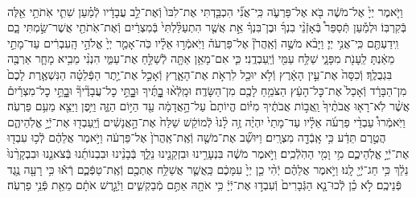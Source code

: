 \documentclass[twoside, openany, parskip=half, 11pt]{book}
\begin{document}
\begin{footnotesize}
\begin{multicols}{2}
\\
וַיֹּ֤אמֶר יְיָ֙ אֶל־מֹשֶׁ֔ה בֹּ֖א אֶל־פַּרְעֹ֑ה כִּֽי־אֲנִ֞י הִכְבַּ֤דְתִּי אֶת־לִבּוֹ֙ וְֿאֶת־לֵ֣ב עֲבָדָ֔יו לְֿמַ֗עַן שִׁתִ֛י אֹֽתֹתַ֥י אֵ֖לֶּה בְּֿקִרְבּֽוֹ׃ וּלְמַ֡עַן תְּֿסַפֵּר֩ בְּֿאָזְֿנֵ֨י בִנְךָ֜ וּבֶן־בִּנְךָ֗ אֵ֣ת אֲשֶׁ֤ר הִתְעַלַּ֨לְתִּי֙ בְּֿמִצְרַ֔יִם וְֿאֶת־אֹֽתֹתַ֖י אֲשֶׁר־שַׂ֣מְתִּי בָ֑ם וִֽידַעְתֶּ֖ם כִּֽי־אֲנִ֥י יְיָ׃ וַיָּבֹ֨א מֹשֶׁ֣ה וְֿאַֽהֲרֹן֘ אֶל־פַּרְעֹה֒ וַיֹּֽאמְֿר֣וּ אֵלָ֗יו כֹּֽה־אָמַ֤ר יְיָ֙ אֱלֹהֵ֣י הָֽעִבְרִ֔ים עַד־מָתַ֣י מֵאַ֔נְתָּ לֵֽעָנֹ֖ת מִפָּנָ֑י שַׁלַּ֥ח עַמִּ֖י וְֿיַֽעַבְדֻֽנִי׃  כִּ֛י אִם־מָאֵ֥ן אַתָּ֖ה לְֿשַׁלֵּ֣חַ אֶת־עַמִּ֑י הִנְנִ֨י מֵבִ֥יא מָחָ֛ר אַרְבֶּ֖ה בִּגְבֻלֶֽךָ׃ וְֿכִסָּה֙ אֶת־עֵ֣ין הָאָ֔רֶץ וְֿלֹ֥א יוּכַ֖ל לִרְאֹ֣ת אֶת־הָאָ֑רֶץ וְֿאָכַ֣ל אֶת־יֶ֣תֶר הַפְּֿלֵטָ֗ה הַנִּשְׁאֶ֤רֶת לָכֶם֙ מִן־הַבָּרָ֔ד וְֿאָכַל֙ אֶת־כׇּל־הָעֵ֔ץ הַצֹּמֵ֥חַ לָכֶ֖ם מִן־הַשָּׂדֶֽה׃ וּמָֽלְֿא֨וּ בׇׇׇׇׇָתֶּ֜יךָ וּבׇׇׇָתֵּ֣י כׇל־עֲבָדֶ֘יךָ֘ וּבׇׇׇָתֵּ֣י כׇל־מִצְרַ֒יִם֒ אֲשֶׁ֨ר לֹֽא־רָא֤וּ אֲבֹתֶ֨יךָ֙ וַֽאֲב֣וֹת אֲבֹתֶ֔יךָ מִיּ֗וֹם הֱיוֹתָם֙ עַל־הָ֣אֲדָמָ֔ה עַ֖ד הַיּ֣וֹם הַזֶּ֑ה וַיִּ֥פֶן וַיֵּצֵ֖א מֵעִ֥ם פַּרְעֹֽה׃  וַיֹּֽאמְֿרוּ֩ עַבְדֵ֨י פַרְעֹ֜ה אֵלָ֗יו עַד־מָתַי֙ יִהְיֶ֨ה זֶ֥ה לָ֨נוּ֙ לְֿמוֹקֵ֔שׁ שַׁלַּח֙ אֶת־הָ֣אֲנָשִׁ֔ים וְֿיַֽעַבְד֖וּ אֶת־יְֿיָ֣ אֱלֹֽהֵיהֶ֑ם הֲטֶ֣רֶם תֵּדַ֔ע כִּ֥י אָֽבְֿדָ֖ה מִצְרָֽיִם׃ וַיּוּשַׁ֞ב אֶת־מֹשֶׁ֤ה וְֿאֶֽת־אַֽהֲרֹן֙ אֶל־פַּרְעֹ֔ה וַיֹּ֣אמֶר אֲלֵהֶ֔ם לְֿכ֥וּ עִבְד֖וּ אֶת־יְֿיָ֣ אֱלֹֽהֵיכֶ֑ם מִ֥י וָמִ֖י הַהֹֽלְֿכִֽים׃ וַיֹּ֣אמֶר מֹשֶׁ֔ה בִּנְעָרֵ֥ינוּ וּבִזְקֵנֵ֖ינוּ נֵלֵ֑ךְ בְּֿבָנֵ֨ינוּ וּבִבְנוֹתֵ֜נוּ בְּֿצֹאנֵ֤נוּ וּבִבְקָרֵ֨נוּ֙ נֵלֵ֔ךְ כִּ֥י חַג־יְֿיָ֖ לָֽנוּ׃ וַיֹּ֣אמֶר אֲלֵהֶ֗ם יְֿהִ֨י כֵ֤ן יְיָ֙ עִמָּכֶ֔ם כַּֽאֲשֶׁ֛ר אֲשַׁלַּ֥ח אֶתְכֶ֖ם וְֿאֶֽת־טַפְּֿכֶ֑ם רְֿא֕וּ כִּ֥י רָעָ֖ה נֶ֥גֶד פְּֿנֵיכֶֽם׃ לֹ֣א כֵ֗ן לְֿכוּ־נָ֤א הַגְּֿבָרִים֙ וְֿעִבְד֣וּ אֶת־יְֿיָ֔ כִּ֥י אֹתָ֖הּ אַתֶּ֣ם מְֿבַקְשִׁ֑ים וַיְֿגָ֣רֶשׁ אֹתָ֔ם מֵאֵ֖ת פְּֿנֵ֥י פַרְעֹֽה׃



\end{multicols}
\end{footnotesize}
\end{document}
